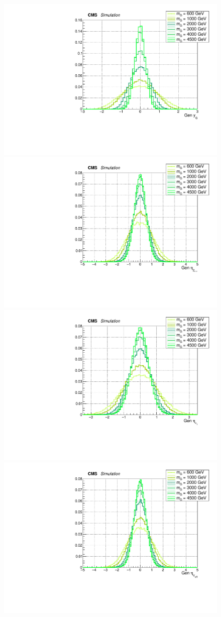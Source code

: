  \begin{figure}[!htb]
   \begin{center}
     \includegraphics[width=.495\textwidth]{Gen_v9/XZZInv_g_XRapidity.pdf}%
     \\
     \includegraphics[width=.495\textwidth]{Gen_v9/XZZInv_g_ZLepEta.pdf}%
     \includegraphics[width=.495\textwidth]{Gen_v9/XZZInv_g_Lep1Eta.pdf}%
     \\
     \includegraphics[width=.495\textwidth]{Gen_v9/XZZInv_g_VHadEta.pdf}%

\end{center}
\end{figure}
